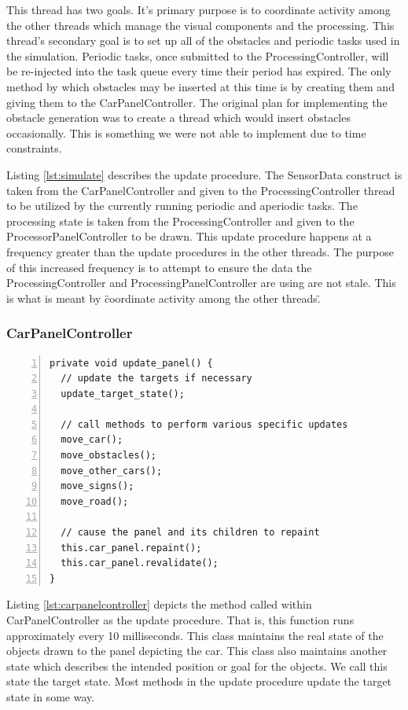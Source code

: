 \documentclass{article} %
\begin{document}
This thread has two goals. 
It's primary purpose is to coordinate activity among the other threads which manage the visual components and the processing.
This thread's secondary goal is to set up all of the obstacles and periodic tasks used in the simulation. 
Periodic tasks, once submitted to the ProcessingController, will be re-injected into the task queue every time their period has expired.
The only method by which obstacles may be inserted at this time is by creating them and giving them to the CarPanelController.
The original plan for implementing the obstacle generation was to create a thread which would insert obstacles occasionally.
This is something we were not able to implement due to time constraints.

Listing \ref{lst:simulate} describes the update procedure.
The SensorData construct is taken from the CarPanelController and given to the ProcessingController thread to be utilized by the currently running periodic and aperiodic tasks.
The processing state is taken from the ProcessingController and given to the ProcessorPanelController to be drawn.
This update procedure happens at a frequency greater than the update procedures in the other threads.
The purpose of this increased frequency is to attempt to ensure the data the ProcessingController and ProcessingPanelController are using are not stale.
This is what is meant by \"coordinate activity among the other threads\".

\subsubsection{CarPanelController}
\begin{lstlisting}[caption={Panel Update Procedure},label={lst:carpanelcontroller},numbers=left]
private void update_panel() {
  // update the targets if necessary
  update_target_state();

  // call methods to perform various specific updates
  move_car();
  move_obstacles();
  move_other_cars();
  move_signs();
  move_road();

  // cause the panel and its children to repaint
  this.car_panel.repaint();
  this.car_panel.revalidate();
}
\end{lstlisting}

Listing \ref{lst:carpanelcontroller} depicts the method called within CarPanelController as the update procedure.
That is, this function runs approximately every 10 milliseconds.
This class maintains the real state of the objects drawn to the panel depicting the car.
This class also maintains another state which describes the intended position or goal for the objects.
We call this state the target state.
Most methods in the update procedure update the target state in some way.
\end{document}
